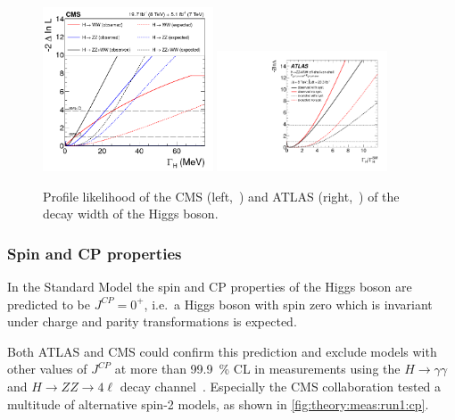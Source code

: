 \begin{figure}[htbp]
    \centering
    \includegraphics[width=0.45\textwidth]{./figures/theory/width_ZZ+WW_CMS.png}
    \includegraphics[width=0.45\textwidth]{./figures/theory/width_ZZ+WW_ATLAS.pdf}
    \caption{Profile likelihood of the CMS (left,~\cite{HiggsGammaOffshellCMSZZ}) and ATLAS (right,~\cite{HiggsGammaOffshellATLAS}) of the decay width of the Higgs boson.}\label{fig:theory:meas:run1:gamma}
\end{figure}

\subsubsection{Spin and CP properties}\label{subsub:theory:meas:run1:cp}

In the Standard Model the spin and CP properties of the Higgs boson are predicted to be $J^{CP} = 0^+$, i.e.\ a Higgs boson with spin zero
which is invariant under charge and parity transformations is expected.

Both ATLAS and CMS could confirm this prediction and exclude models with other values of $J^{CP}$ at more than \SI{99.9}{\percent} CL
in measurements using the $H \to \gamma\gamma$ and $H\to ZZ \to 4\ell$ decay channel~\cite{HiggsCPATLAS,HiggsCPCMS}.
Especially the CMS collaboration tested a multitude of alternative spin-2 models, as shown in \cref{fig:theory:meas:run1:cp}.

